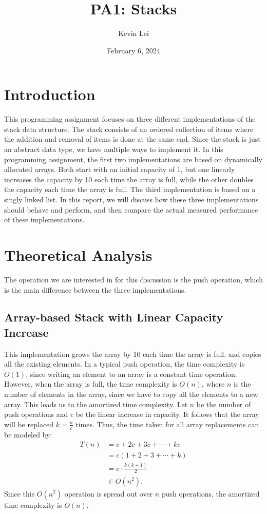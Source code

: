 \documentclass{article}
\title{PA1: Stacks}
\author{Kevin Lei}
\date{February 6, 2024}
\begin{document}
\maketitle

\section{Introduction}

\indent This programming assignment focuses on three different implementations of the stack data structure. 
The stack consists of an ordered collection of items where the addition and removal of items is done at the same end.
Since the stack is just an abstract data type, we have multiple ways to implement it.
In this programming assignment, the first two implementations are based on dynamically allocated arrays. 
Both start with an initial capacity of 1, but one linearly increases the capacity by 10 each time the array is full, while the other doubles the capacity each time the array is full.
The third implementation is based on a singly linked list.
In this report, we will discuss how these three implementations should behave and perform, and then compare the actual measured performance of these implementations.

\section{Theoretical Analysis}
The operation we are interested in for this discussion is the push operation, which is the main difference between the three implementations.

\subsection{Array-based Stack with Linear Capacity Increase}
This implementation grows the array by 10 each time the array is full, and copies all the existing elements. 
In a typical push operation, the time complexity is $O(1)$, since writing an element to an array is a constant time operation.
However, when the array is full, the time complexity is $O(n)$, where $n$ is the number of elements in the array, since we have to copy all the elements to a new array.
This leads us to the amortized time complexity.
Let $n$ be the number of push operations and $c$ be the linear increase in capacity. 
It follows that the array will be replaced $k = \frac{n}{c}$ times.
Thus, the time taken for all array replacements can be modeled by:
\begin{align*}
    T(n) &= c + 2c + 3c + \cdots + kc \\
    &= c(1 + 2 + 3 + \cdots + k) \\
    &= c \cdot \frac{k(k+1)}{2} \\
    &\in O(n^2).
\end{align*}
Since this $O(n^2)$ operation is spread out over $n$ push operations, the amortized time complexity is $O(n)$.
\end{document}
